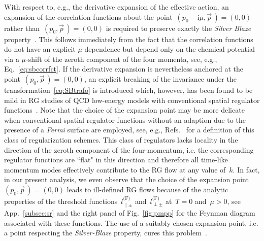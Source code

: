 \documentclass[prd,english,preprintnumbers,amsmath,amssymb,nofootinbib,twocolumn,superscriptaddress]{revtex4-1}
\newcommand{\I}{\mathrm{i}}
\begin{document}
{{With respect to, e.g., the derivative expansion of the effective action, an expansion of the 
correlation functions
about the point~$(p_0-\I\mu,\vec{p}^{\,})=(0,0)$ rather than~$(p_0,\vec{p}^{\,})=(0,0)$ is required to 
preserve exactly the {\it Silver Blaze} property~\cite{Fu:2015naa}. This follows immediately from the fact that the 
correlation functions do not have an explicit $\mu$-dependence but depend only on the chemical potential 
via a $\mu$-shift of the zeroth component of the four momenta, see, e.g., Eq.~\eqref{eq:sbcorrfct}.
If the derivative expansion is nevertheless 
anchored at the point~$(p_0,\vec{p}^{\,})=(0,0)$, an explicit breaking of the invariance 
under the transformation~\eqref{eq:SBtrafo} is introduced which, however, has been found to be mild in  
RG studies of QCD low-energy models with conventional {spatial 
regulator functions~\cite{Fu:2015naa,Khan:2015puu,Strodthoff:2011tz,*Kamikado:2012bt,*Strodthoff:2013cua,*Fu:2016tey}. 
Note that the choice of the}
expansion point may be more delicate 
when conventional spatial regulator functions without an adaption due to the presence of a {\it Fermi} surface are employed, 
see, e.g., Refs.~\cite{Braun:2003ii,Schaefer:2004en,Blaizot:2006rj,Litim:2006ag} for a definition of this class of
{regularization schemes.} 
This class of regulators lacks locality in the direction of the zeroth component
of the four-momentum, i.e. the corresponding regulator functions are ``flat" in this direction and therefore
all time-like momentum modes effectively contribute to the RG flow at any value of~$k$. In fact, in our present analysis, we even observe
that the choice of the expansion point~$(p_0,\vec{p}^{\,})=(0,0)$
leads to ill-defined RG flows because of the analytic properties
of the threshold functions~$l^{\text{(F)}}_{\parallel \pm}$ and~$l^{\text{(F)}}_{\perp \pm}$ 
at~$T=0$ and~$\mu>0$, see App.~\ref{subsec:sr} and
the right panel of Fig.~\ref{fig:pmpp} for the Feynman diagram associated with these functions.  
The use of a suitably chosen expansion point, i.e. a point 
respecting the {\it Silver-Blaze} property, cures this problem~\cite{BraunLeonhPawlo}. 

}}
\end{document}

